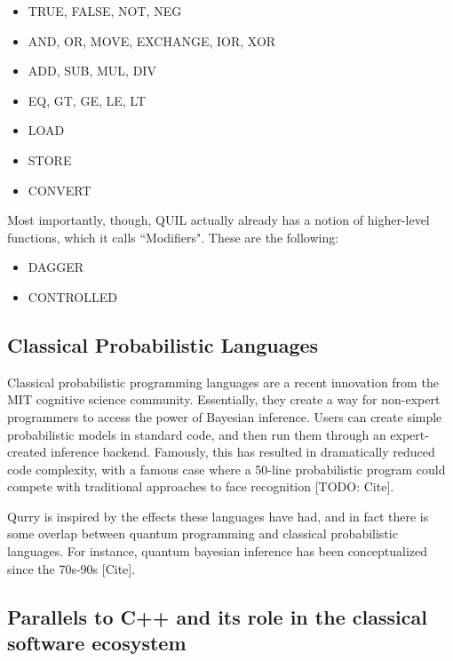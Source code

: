 \documentclass[journal]{article}
\begin{document}
\begin{itemize}
    \item TRUE, FALSE, NOT, NEG %
    \item AND, OR, MOVE, EXCHANGE, IOR, XOR %
    \item ADD, SUB, MUL, DIV %
    \item EQ, GT, GE, LE, LT %
    \item LOAD %
    \item STORE %
    \item CONVERT %
\end{itemize}

Most importantly, though, QUIL actually already has a notion of higher-level functions, which it calls ``Modifiers".
These are the following:
\begin{itemize}
    \item DAGGER
    \item CONTROLLED
\end{itemize}

\subsection{Classical Probabilistic Languages}

 Classical probabilistic programming languages are a recent innovation from the MIT cognitive science community. 
 Essentially, they create a way for non-expert programmers to access the power of Bayesian inference. 
 Users can create simple probabilistic models in standard code, and then run them through an expert-created inference backend.
 Famously, this has resulted in dramatically reduced code complexity, with a famous case where a 50-line probabilistic program could compete with traditional approaches to face recognition [TODO: Cite].

 Qurry is inspired by the effects these languages have had, and in fact there is some overlap between quantum programming and classical probabilistic languages.
 For instance, quantum bayesian inference has been conceptualized since the 70s-90s [Cite].

\subsection{Parallels to C++ and its role in the classical software ecosystem}
\end{document}
